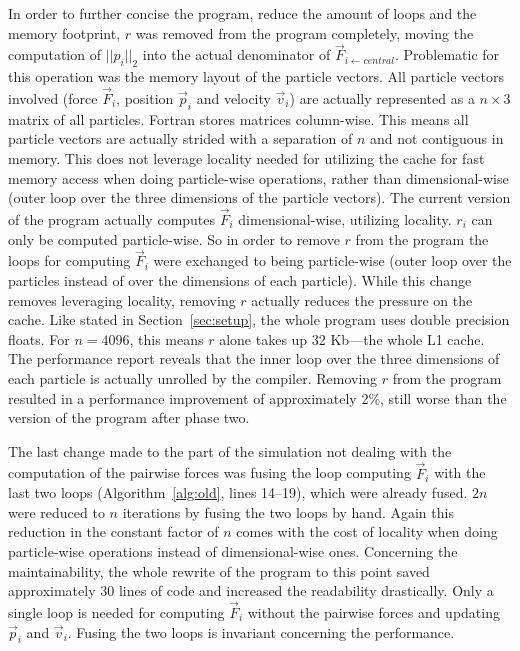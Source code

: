 \documentclass[twoside,11pt]{article}
\begin{document}
In order to further concise the program, reduce the amount of loops
and the memory footprint, $r$ was removed from the program completely,
moving the computation of $||p_i||_2$ into the actual denominator of
$\vec{F}_{i \leftarrow central}$.
Problematic for this operation was the memory layout of the particle
vectors.
All particle vectors involved (force $\vec{F}_i$, position $\vec{p}_i$
and velocity $\vec{v}_i$) are actually represented as a $n \times 3$
matrix of all particles.
Fortran stores matrices column-wise.
This means all particle vectors are actually strided with a separation
of $n$ and not contiguous in memory.
This does not leverage locality needed for utilizing the cache for
fast memory access when doing particle-wise operations, rather than
dimensional-wise (outer loop over the three dimensions of the particle
vectors).
The current version of the program actually computes $\vec{F}_i$
dimensional-wise, utilizing locality.
$r_i$ can only be computed particle-wise.
So in order to remove $r$ from the program the loops for computing
$\vec{F}_i$ were exchanged to being particle-wise (outer loop over the
particles instead of over the dimensions of each particle).
While this change removes leveraging locality, removing $r$ actually
reduces the pressure on the cache.
Like stated in Section~\ref{sec:setup}, the whole program uses
double precision floats.
For $n = 4096$, this means $r$ alone takes up 32 Kb---the whole L1
cache.
The performance report reveals that the inner loop over the three
dimensions of each particle is actually unrolled by the compiler.
Removing $r$ from the program resulted in a performance improvement of
approximately 2\%, still worse than the version of the program after
phase two.

The last change made to the part of the simulation not dealing with
the computation of the pairwise forces was fusing the loop computing
$\vec{F}_i$ with the last two loops (Algorithm~\ref{alg:old}, lines
14--19), which were already fused.
$2n$ were reduced to $n$ iterations by fusing the two loops by hand.
Again this reduction in the constant factor of $n$ comes with the
cost of locality when doing particle-wise operations instead of
dimensional-wise ones.
Concerning the maintainability, the whole rewrite of the program to
this point saved approximately 30 lines of code and increased the
readability drastically.
Only a single loop is needed for computing $\vec{F}_i$ without the
pairwise forces and updating $\vec{p}_i$ and $\vec{v}_i$.
Fusing the two loops is invariant concerning the performance.
\end{document}

